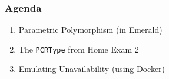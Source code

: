 \begin{frame}

\frametitle{Agenda}

\begin{enumerate}

\item Parametric Polymorphism (in Emerald)

\item The \texttt{PCRType} from Home Exam 2

\item Emulating Unavailability (using Docker)

\end{enumerate}

\end{frame}
